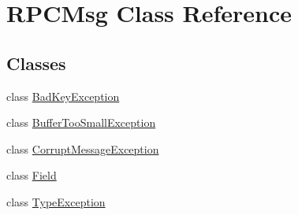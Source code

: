 \hypertarget{classRPCMsg}{
\section{RPCMsg Class Reference}
\label{classRPCMsg}
}
\subsection*{Classes}
\begin{DoxyCompactItemize}
\item 
class \hyperlink{classRPCMsg_1_1BadKeyException}{BadKeyException}
\item 
class \hyperlink{classRPCMsg_1_1BufferTooSmallException}{BufferTooSmallException}
\item 
class \hyperlink{classRPCMsg_1_1CorruptMessageException}{CorruptMessageException}
\item 
class \hyperlink{classRPCMsg_1_1Field}{Field}
\item 
class \hyperlink{classRPCMsg_1_1TypeException}{TypeException}
\end{DoxyCompactItemize}
